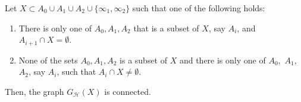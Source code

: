 \documentclass[11pt,a4paper]{article}
\begin{document}


\begin{lemma}
\label{lemma:2,3k+2}
    Let $X \subset A_0 \cup A_1 \cup A_2 \cup \{ \infty_1, \infty_2 \}$ such that one of the following holds:
        \begin{enumerate}
            \item There is only one of $A_0, A_1, A_2$ that is a subset of $X$, say $A_i$, and $A_{i+1} \cap X = \emptyset$.
            \item None of the sets $A_0, A_1, A_2$ is a subset of $X$ and there is only one of $A_0,$ $A_1,$ $ A_2$, say $A_i$, such that $A_i \cap X \neq \emptyset$.
        \end{enumerate}
    Then, the graph $G_{\mathcal{H}} (X)$ is connected.
\end{lemma}
\end{document}
